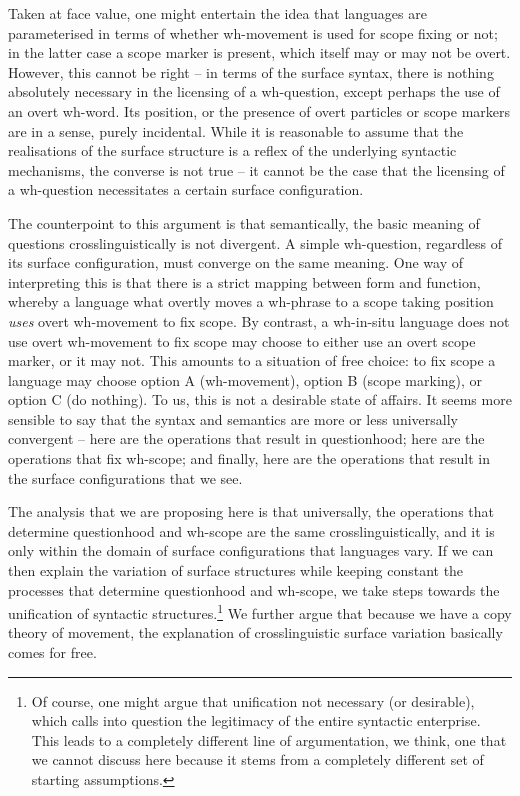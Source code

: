 \documentclass[charis]{glossa}
\begin{document}
Taken at face value, one might entertain the idea that languages are parameterised in terms of whether wh-movement is used for scope fixing or not; in the latter case a scope marker is present, which itself may or may not be overt. However, this cannot be right -- in terms of the surface syntax, there is nothing absolutely necessary in the licensing of a wh-question, except perhaps the use of an overt wh-word. Its position, or the presence of overt particles or scope markers are in a sense, purely incidental. While it is reasonable to assume that the realisations of the surface structure is a reflex of the underlying syntactic mechanisms, the converse is not true -- it cannot be the case that the licensing of a wh-question necessitates a certain surface configuration.

The counterpoint to this argument is that semantically, the basic meaning of questions crosslinguistically is not divergent. A simple wh-question, regardless of its surface configuration, must converge on the same meaning. One way of interpreting this is that there is a strict mapping between form and function, whereby a language what overtly moves a wh-phrase to a scope taking position \textit{uses} overt wh-movement to fix scope. By contrast, a wh-in-situ language does not use overt wh-movement to fix scope may choose to either use an overt scope marker, or it may not. This amounts to a situation of free choice: to fix scope a language may choose option A (wh-movement), option B (scope marking), or option C (do nothing). To us, this is not a desirable state of affairs. It seems more sensible to say that the syntax and semantics are more or less universally convergent -- here are the operations that result in questionhood; here are the operations that fix wh-scope; and finally, here are the operations that result in the surface configurations that we see.

The analysis that we are proposing here is that universally, the operations that determine questionhood and wh-scope are the same crosslinguistically, and it is only within the domain of surface configurations that languages vary. If we can then explain the variation of surface structures while keeping constant the processes that determine questionhood and wh-scope, we take steps towards the unification of syntactic structures.\footnote{Of course, one might argue that unification not necessary (or desirable), which calls into question the legitimacy of the entire syntactic enterprise. This leads to a completely different line of argumentation, we think, one that we cannot discuss here because it stems from a completely different set of starting assumptions.} We further argue that because we have a copy theory of movement, the explanation of crosslinguistic surface variation basically comes for free.
\end{document}
